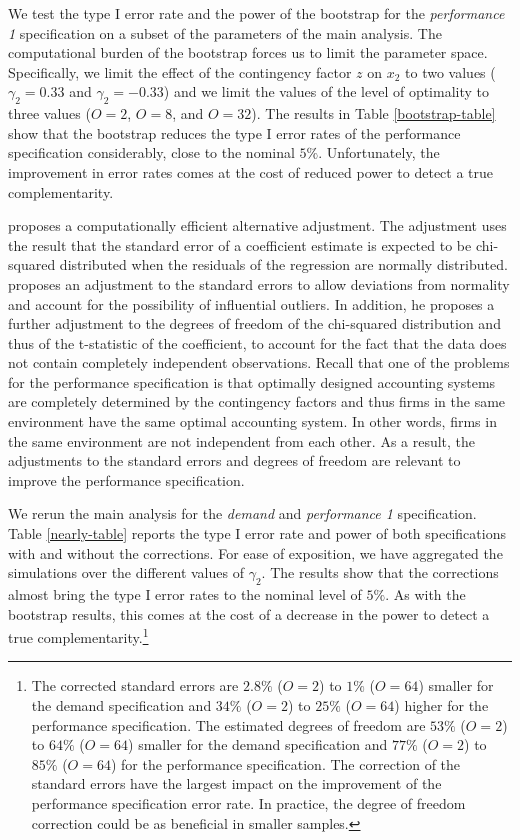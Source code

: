 \documentclass[12pt]{article}
\begin{document}
We test the type I error rate and the power of the bootstrap for the \emph{performance 1} specification on a subset of the parameters of the main analysis. The computational burden of the bootstrap forces us to limit the parameter space. Specifically, we limit the effect of the contingency factor $z$ on $x_2$ to two values ($\gamma_2 = 0.33$ and $\gamma_2 = -0.33$) and we limit the values of the level of optimality to three values ($O=2$, $O=8$, and $O=32$). The results in Table \ref{bootstrap-table} show that the bootstrap reduces the type I error rates of the performance specification considerably, close to the nominal $5\%$.  Unfortunately, the improvement in error rates comes at the cost of reduced power to detect a true complementarity.



\citet{young_improved_2016} proposes a computationally efficient alternative adjustment. The adjustment uses the result that the standard error of a coefficient estimate is expected to be chi-squared distributed when the residuals of the regression are normally distributed. \cite{young_improved_2016} proposes an adjustment to the standard errors to allow deviations from normality and account for the possibility of influential outliers. In addition, he proposes a further adjustment to the degrees of freedom of the chi-squared distribution and thus of the t-statistic of the coefficient, to account for the fact that the data does not contain completely independent observations. Recall that one of the problems for the performance specification is that optimally designed accounting systems are completely determined by the contingency factors and thus firms in the same environment have the same optimal accounting system. In other words, firms in the same environment are not independent from each other. As a result, the adjustments to the standard errors and degrees of freedom are relevant to improve the performance specification.

We rerun the main analysis for the \emph{demand} and \emph{performance 1} specification. Table \ref{nearly-table} reports the type I error rate and power of both specifications with and without the corrections. For ease of exposition, we have aggregated the simulations over the different values of $\gamma_2$. The results show that the corrections almost bring the type I error rates to the nominal level of $5\%$. As with the bootstrap results, this comes at the cost of a decrease in the power to detect a true complementarity.\footnote{The corrected standard errors are $2.8\%$ ($O = 2$) to $1\%$ ($O = 64$) smaller for the demand specification and $34\%$ ($O = 2$) to $25\%$ ($O = 64$) higher for the performance specification. The estimated degrees of freedom are $53\%$ ($O = 2$) to $64\%$ ($O = 64$) smaller for the demand specification and $77\%$ ($O = 2$) to $85\%$ ($O = 64$) for the performance specification. The correction of the standard errors have the largest impact on the improvement of the performance specification error rate. In practice, the degree of freedom correction could be as beneficial in smaller samples.}
\end{document}
